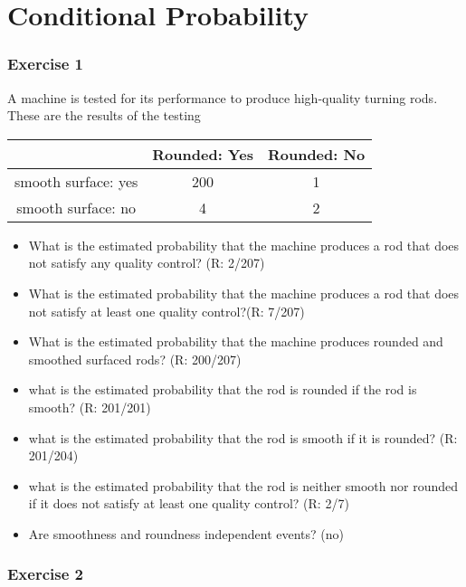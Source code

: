 \documentclass[
]{book}
\begin{document}
\hypertarget{conditional-probability-3}{%
\section{Conditional Probability}\label{conditional-probability-3}}

\hypertarget{exercise-1-2}{%
\subsubsection{Exercise 1}\label{exercise-1-2}}

A machine is tested for its performance to produce high-quality turning rods. These are the results of the testing

\begin{longtable}[]{@{}ccc@{}}
\toprule
& Rounded: Yes & Rounded: No \\
\midrule
\endhead
smooth surface: yes & 200 & 1 \\
smooth surface: no & 4 & 2 \\
\bottomrule
\end{longtable}

\begin{itemize}
\item
  What is the estimated probability that the machine produces a rod that does not satisfy any quality control? (R: 2/207)
\item
  What is the estimated probability that the machine produces a rod that does not satisfy at least one quality control?(R: 7/207)
\item
  What is the estimated probability that the machine produces rounded and smoothed surfaced rods? (R: 200/207)
\item
  what is the estimated probability that the rod is rounded if the rod is smooth? (R: 201/201)
\item
  what is the estimated probability that the rod is smooth if it is rounded? (R: 201/204)
\item
  what is the estimated probability that the rod is neither smooth nor rounded if it does not satisfy at least one quality control? (R: 2/7)
\item
  Are smoothness and roundness independent events? (no)
\end{itemize}

\hypertarget{exercise-2-2}{%
\subsubsection{Exercise 2}\label{exercise-2-2}}
\end{document}
